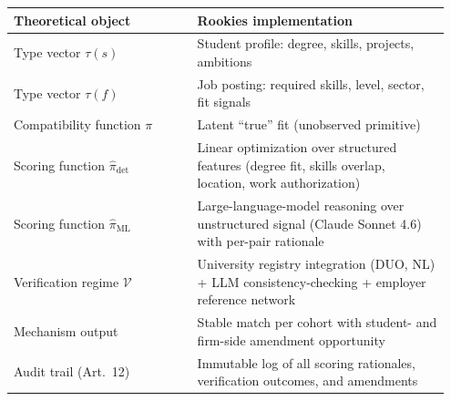 \documentclass[11pt,a4paper]{article}
\begin{document}
\begin{center}
\begin{tabular}{p{0.40\linewidth}p{0.55\linewidth}}
\toprule
\textbf{Theoretical object} & \textbf{Rookies implementation} \\
\midrule
Type vector $\tau(s)$ & Student profile: degree, skills, projects, ambitions \\
Type vector $\tau(f)$ & Job posting: required skills, level, sector, fit signals \\
Compatibility function $\pi$ & Latent ``true'' fit (unobserved primitive) \\
Scoring function $\widehat{\pi}_{\mathrm{det}}$ & Linear optimization over structured features (degree fit, skills overlap, location, work authorization) \\
Scoring function $\widehat{\pi}_{\mathrm{ML}}$ & Large-language-model reasoning over unstructured signal (Claude Sonnet 4.6) with per-pair rationale \\
Verification regime $\mathcal{V}$ & University registry integration (DUO, NL) + LLM consistency-checking + employer reference network \\
Mechanism output & Stable match per cohort with student- and firm-side amendment opportunity \\
Audit trail (Art.\ 12) & Immutable log of all scoring rationales, verification outcomes, and amendments \\
\bottomrule
\end{tabular}
\end{center}
\end{document}
